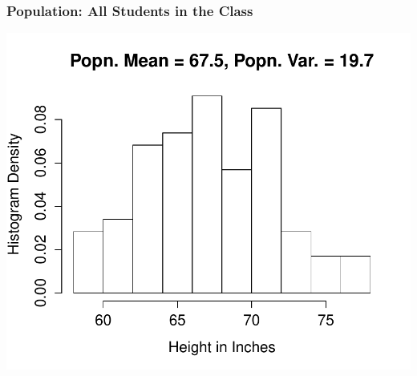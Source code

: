 \documentclass[handout]{beamer}
\begin{document}
\begin{frame}
\frametitle{Population: All Students in the Class}
\begin{center}
\includegraphics[scale = 0.54]{./images/height_hist}
\end{center}
\end{frame}
\end{document}
